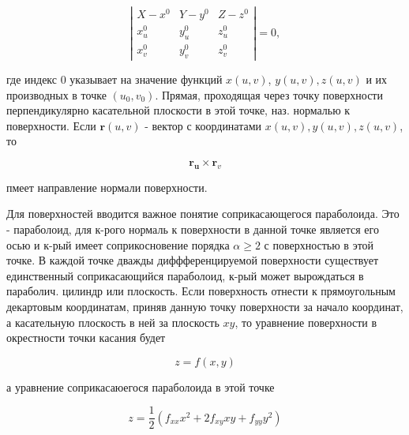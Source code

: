 \documentclass[10pt]{article}
\begin{document}
\[

\left|\begin{array}{ccc}

X-x^{0} & Y-y^{0} & Z-z^{0} \\

x_{u}^{0} & y_{u}^{0} & z_{u}^{0} \\

x_{v}^{0} & y_{v}^{0} & z_{v}^{0}

\end{array}\right|=0,

\]



где индекс 0 указывает на значение функций $x(u, v)$, $y(u, v), z(u, v)$ и их производных в точке $\left(u_{0}, v_{0}\right)$. Прямая, проходящая через точку поверхности перпендикулярно касательной плоскости в этой точке, наз. нормалью к поверхности. Если $\boldsymbol{r}(u, v)$ - вектор с координатами $x(u, v), y(u, v), z(u, v)$, то



\[

\boldsymbol{r}_{\boldsymbol{u}} \times \boldsymbol{r}_{v}

\]



пмеет направление нормали поверхности.



Для поверхностей вводится важное понятие соприкасающегося параболоида. Это - параболоид, для к-рого нормаль к поверхности в данной точке является его осью и к-рый имеет соприкосновение порядка $\alpha \geqslant 2$ с поверхностью в этой точке. В каждой точке дважды диффференцируемой поверхности существует единственный соприкасающийся параболоид, к-рый может вырождаться в параболич. цилиндр или плоскость. Если поверхность отнести к прямоугольным декартовым координатам, приняв данную точку поверхности за начало координат, а касательную плоскость в ней за плоскость $x y$, то уравнение поверхности в окрестности точки касания будет



\[

z=f(x, y)

\]



а уравнение соприкасаюегося параболоида в этой точке



\[

z=\frac{1}{2}\left(f_{x x} x^{2}+2 f_{x y} x y+f_{y y} y^{2}\right)

\]
\end{document}
